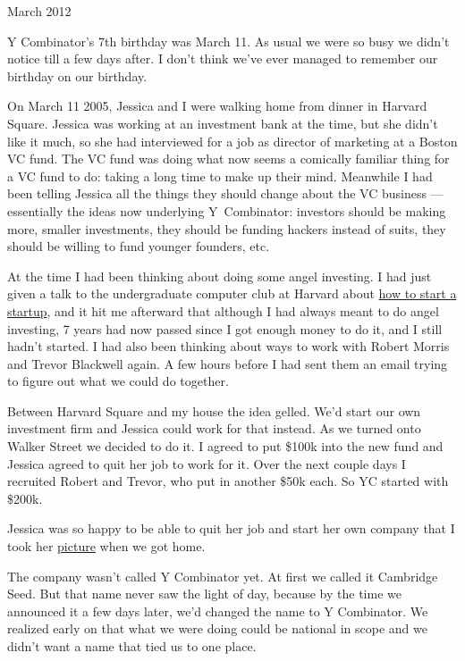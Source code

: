 March 2012

Y Combinator's 7th birthday was March 11. As usual we were so busy we
didn't notice till a few days after. I don't think we've ever managed to
remember our birthday on our birthday.

On March 11 2005, Jessica and I were walking home from dinner in Harvard
Square. Jessica was working at an investment bank at the time, but she
didn't like it much, so she had interviewed for a job as director of
marketing at a Boston VC fund. The VC fund was doing what now seems a
comically familiar thing for a VC fund to do: taking a long time to make
up their mind. Meanwhile I had been telling Jessica all the things they
should change about the VC business --- essentially the ideas now
underlying Y~Combinator: investors should be making more, smaller
investments, they should be funding hackers instead of suits, they
should be willing to fund younger founders, etc.

At the time I had been thinking about doing some angel investing. I had
just given a talk to the undergraduate computer club at Harvard about
\href{start.html}{how to start a startup}, and it hit me afterward that
although I had always meant to do angel investing, 7 years had now
passed since I got enough money to do it, and I still hadn't started. I
had also been thinking about ways to work with Robert Morris and Trevor
Blackwell again. A few hours before I had sent them an email trying to
figure out what we could do together.

Between Harvard Square and my house the idea gelled. We'd start our own
investment firm and Jessica could work for that instead. As we turned
onto Walker Street we decided to do it. I agreed to put \$100k into the
new fund and Jessica agreed to quit her job to work for it. Over the
next couple days I recruited Robert and Trevor, who put in another \$50k
each. So YC started with \$200k.

Jessica was so happy to be able to quit her job and start her own
company that I took her
\href{https://web.archive.org/web/20170609055553/http://www.ycombinator.com/yc05.html}{picture}
when we got home.

The company wasn't called Y Combinator yet. At first we called it
Cambridge Seed. But that name never saw the light of day, because by the
time we announced it a few days later, we'd changed the name to Y
Combinator. We realized early on that what we were doing could be
national in scope and we didn't want a name that tied us to one place.

